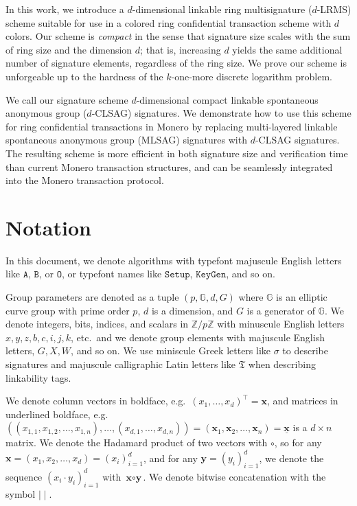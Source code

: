 \documentclass{article}
\theoremstyle{plain}
\theoremstyle{definition}
\begin{document}
In this work, we introduce a $d$-dimensional linkable ring multisignature ($d$-LRMS) scheme suitable for use in a colored ring confidential transaction scheme with $d$ colors. Our scheme is \textit{compact} in the sense that signature size scales with the sum of ring size and the dimension $d$; that is, increasing $d$ yields the same additional number of signature elements, regardless of the ring size. We prove our scheme is unforgeable up to the hardness of the $k$-one-more discrete logarithm problem. 

We call our signature scheme $d$-dimensional compact linkable spontaneous anonymous group ($d$-CLSAG) signatures. We demonstrate how to use this scheme for ring confidential transactions in Monero by replacing multi-layered linkable spontaneous anonymous group (MLSAG) signatures with $d$-CLSAG signatures.  The resulting scheme is more efficient in both signature size and verification time than current Monero transaction structures, and can be seamlessly integrated into the Monero transaction protocol.


\section{Notation}

In this document, we denote algorithms with typefont majuscule English letters like $\texttt{A}$, $\texttt{B}$, or $\texttt{O}$, or typefont names like $\texttt{Setup}$, $\texttt{KeyGen}$, and so on.  

Group parameters are denoted as a tuple $(p, \mathbb{G}, d, G)$ where $\mathbb{G}$ is an elliptic curve group with prime order $p$, $d$ is a dimension, and $G$ is a generator of $\mathbb{G}$. We denote integers, bits, indices, and scalars in $\mathbb{Z}/p\mathbb{Z}$ with minuscule English letters $x, y, z, b, c, i, j, k$, etc.\ and we denote group elements with majuscule English letters, $G, X, W$, and so on. We use miniscule Greek letters like $\sigma$ to describe signatures and majuscule calligraphic Latin letters like $\mathfrak{T}$ when describing linkability tags.

We denote column vectors in boldface, e.g.\ $(x_1, \ldots, x_d)^\top = \textbf{x}$, and matrices in underlined boldface, e.g.\ $((x_{1,1}, x_{1,2}, \ldots, x_{1,n}), \ldots, (x_{d,1}, \ldots, x_{d,n})) = (\textbf{x}_1, \textbf{x}_2, \ldots, \textbf{x}_n) = \underline{\textbf{x}}$ is a $d\times n$ matrix. We denote the Hadamard product of two vectors with $\circ$, so for any $\textbf{x} = (x_1, x_2, \ldots, x_d) = (x_i)_{i=1}^{d}$, and for any $\textbf{y} = (y_i)_{i=1}^{d}$, we denote the sequence $(x_i \cdot y_i)_{i=1}^{d}$ with $\textbf{x} \circ \textbf{y}$. We denote bitwise concatenation with the symbol $\mid \mid$.
\end{document}

